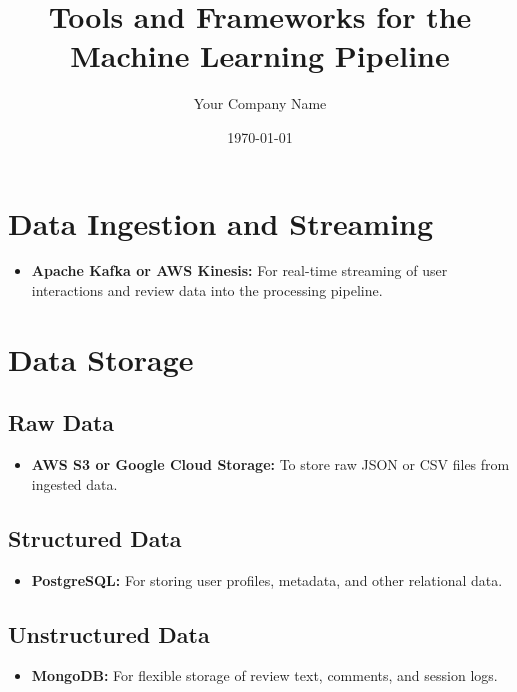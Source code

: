 \documentclass[11pt]{article}
\title{Tools and Frameworks for the Machine Learning Pipeline}
\author{Your Company Name}
\date{\today}
\begin{document}
\maketitle
\tableofcontents
\newpage

\section{Data Ingestion and Streaming}
\begin{itemize}[noitemsep]
    \item \textbf{Apache Kafka or AWS Kinesis:} For real-time streaming of user interactions and review data into the processing pipeline.
\end{itemize}

\section{Data Storage}
\subsection{Raw Data}
\begin{itemize}[noitemsep]
    \item \textbf{AWS S3 or Google Cloud Storage:} To store raw JSON or CSV files from ingested data.
\end{itemize}

\subsection{Structured Data}
\begin{itemize}[noitemsep]
    \item \textbf{PostgreSQL:} For storing user profiles, metadata, and other relational data.
\end{itemize}

\subsection{Unstructured Data}
\begin{itemize}[noitemsep]
    \item \textbf{MongoDB:} For flexible storage of review text, comments, and session logs.
\end{itemize}
\end{document}
